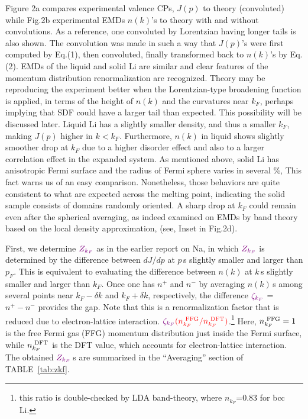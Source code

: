 \documentclass[twocolumn,showpacs,showkeys,fleqn,prl,superscriptaddress]{revtex4}%
\newcommand{\nn}[1]{\textnormal{ #1}}
\begin{document}
Figure 2a compares experimental valence CPs, $J(p)$ to theory (convoluted) while Fig.2b experimental EMDs $n(k)$’s to theory with and without convolutions. 
As a reference, one convoluted by Lorentzian having longer tails is also shown. 
The convolution was made in such a way that $J(p)$’s were first computed by Eq.(1), then convoluted, finally transformed back to $n(k)$’s by Eq. (2). 
EMDs of the liquid and solid Li are similar and clear features of the momentum distribution renormalization are recognized.  
Theory may be reproducing the experiment better when the Lorentzian-type broadening function is applied, in terms of the height of $n(k)$ and the curvatures near $k_F$, perhaps implying that SDF could have a larger tail than expected.
This possibility will be discussed later. 
Liquid Li has a slightly smaller density, and thus a smaller $k_F$, making $J(p)$ higher in $k < k_F$.
Furthermore, $n(k)$ in liquid shows slightly smoother drop at $ k_F $ due to a higher disorder effect and also to a larger correlation effect in the expanded system.
As mentioned above, solid Li has anisotropic Fermi surface and the radius of Fermi sphere varies in several \%\cite{saku95,schulke96}, This fact warns us of an easy comparison.
Nonetheless, those behaviors are quite consistent to what are expected across the melting point, indicating the solid sample consists of domains randomly oriented. 
A sharp drop at $k_F$ could remain even after the spherical averaging, as indeed examined on EMDs by band theory based on the local density approximation, (see, Inset in Fig.2d). 


First, we determine ${\color{violet}Z_{k_F}}$ as in the earlier report on Na\cite{simo10}, in which ${\color{violet}Z_{k_F}}$ is determined by the difference between $dJ/dp$ at $p\,$s slightly smaller and larger than $p_F$. 
This is equivalent to evaluating the difference between $n(k)$ at $k\,$s slightly smaller and larger than $k_F$.
Once one has $n^+$ and $n^-$ by averaging $n(k)$\,s among several points near $k_F-\delta k$ and  $k_F+\delta k$, respectively, the difference ${\color{violet}\zeta_{k_F}}$ = $n^+ - n^-$ provides the gap. 
Note that this is a renormalization factor that is reduced due to electron-lattice interaction. 
${\color{violet}\zeta_{k_F}}{\color{red}(n_{k_F}^{\nn{FFG}}/n_{k_F}^{\nn{DFT}})}$.\footnote{this ratio is double-checked by LDA band-theory, where {\color{red}$n_{k_F}$=0.83} for bcc Li.}
Here, $n_{k_F}^{\nn{FFG}}=1$ is the free Fermi gas (FFG) momentum distribution just inside the Fermi surface, while $n_{k_F}^{\nn{DFT}}$ is the DFT value, which accounts for electron-lattice interaction. 
The obtained ${\color{violet}Z_{k_F}}\,$s are summarized in the ``Averaging'' section of TABLE~\ref{tab:zkf}.
\end{document}
